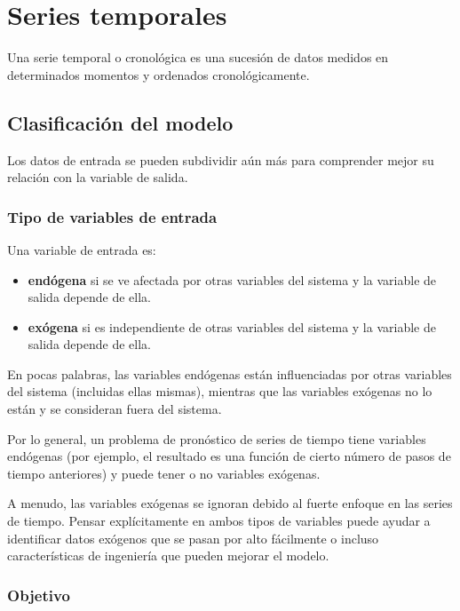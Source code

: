 \documentclass[a4paper,12pt]{article}
\begin{document}
\section{Series temporales}

Una serie temporal o cronológica es una sucesión de datos medidos en determinados momentos y ordenados cronológicamente. \citep{Agrawal2019Mar}

\subsection{Clasificación del modelo}

Los datos de entrada se pueden subdividir aún más para comprender mejor su relación con la variable de salida.

\subsubsection{Tipo de variables de entrada}

Una variable de entrada es:
\begin{itemize}
	\item \textbf{endógena} si se ve afectada por otras variables del sistema y la variable de salida depende de ella.
	\item \textbf{exógena} si es independiente de otras variables del sistema y la variable de salida depende de ella.
\end{itemize}

En pocas palabras, las variables endógenas están influenciadas por otras variables del sistema (incluidas ellas mismas), mientras que las variables exógenas no lo están y se consideran fuera del sistema.

Por lo general, un problema de pronóstico de series de tiempo tiene variables endógenas (por ejemplo, el resultado es una función de cierto número de pasos de tiempo anteriores) y puede tener o no variables exógenas.

A menudo, las variables exógenas se ignoran debido al fuerte enfoque en las series de tiempo. Pensar explícitamente en ambos tipos de variables puede ayudar a identificar datos exógenos que se pasan por alto fácilmente o incluso características de ingeniería que pueden mejorar el modelo.

\subsubsection{Objetivo}
\end{document}
